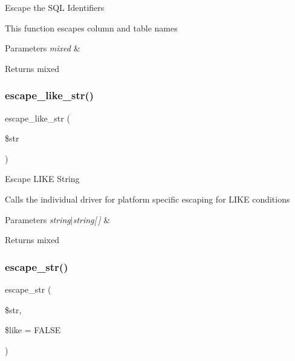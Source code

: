 Escape the S\+QL Identifiers

This function escapes column and table names


\begin{DoxyParams}{Parameters}
{\em mixed} & \\
\hline
\end{DoxyParams}
\begin{DoxyReturn}{Returns}
mixed 
\end{DoxyReturn}
\mbox{\label{class_c_i___d_b__driver_a1a15f371afab8d5cfb35e38fc53c620f}} 
\subsubsection{\texorpdfstring{escape\+\_\+like\+\_\+str()}{escape\_like\_str()}}
{\footnotesize\ttfamily escape\+\_\+like\+\_\+str (\begin{DoxyParamCaption}\item[{}]{\$str }\end{DoxyParamCaption})}

Escape L\+I\+KE String

Calls the individual driver for platform specific escaping for L\+I\+KE conditions


\begin{DoxyParams}{Parameters}
{\em string$\vert$string\mbox{[}$\,$\mbox{]}} & \\
\hline
\end{DoxyParams}
\begin{DoxyReturn}{Returns}
mixed 
\end{DoxyReturn}
\mbox{\label{class_c_i___d_b__driver_aaba16891c8c93600a87075800cc5b72b}} 
\subsubsection{\texorpdfstring{escape\+\_\+str()}{escape\_str()}}
{\footnotesize\ttfamily escape\+\_\+str (\begin{DoxyParamCaption}\item[{}]{\$str,  }\item[{}]{\$like = {\ttfamily FALSE} }\end{DoxyParamCaption})}

